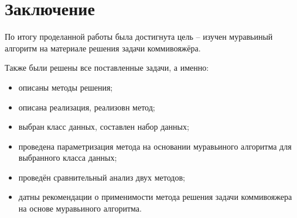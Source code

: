 \chapter*{Заключение}

По итогу проделанной работы была достигнута цель -- изучен муравьиный алгоритм на материале решения задачи коммивояжёра.

Также были решены все поставленные задачи, а именно:

\begin{itemize}
	\item описаны методы решения;
	\item описана реализация, реализовн метод;
	\item выбран класс данных, составлен набор данных;
	\item проведена параметризация метода на основании муравьиного алгоритма для выбранного класса данных;
	\item проведён сравнительный анализ двух методов;
	\item датны рекомендации о применимости метода решения задачи коммивояжера на основе муравьиного алгоритма.
\end{itemize}